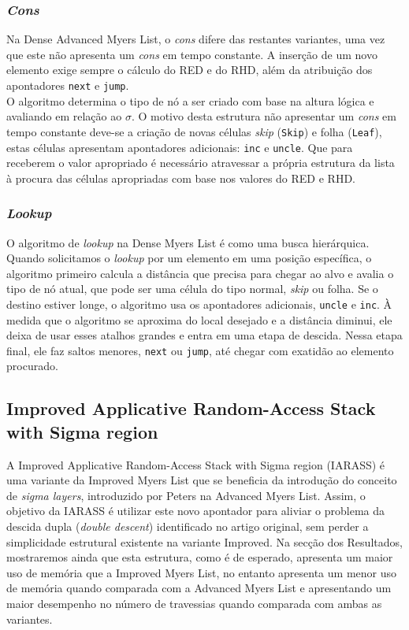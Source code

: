 \subsubsection{\textit{Cons}}

Na Dense Advanced Myers List, o \textit{cons} difere das restantes variantes, uma vez que este não apresenta um \textit{cons} em tempo constante. 
A inserção de um novo elemento exige sempre o cálculo do RED e do RHD, além da atribuição dos apontadores \texttt{next} e \texttt{jump}. 
\\

O algoritmo determina o tipo de nó a ser criado com base na altura lógica e avaliando em relação ao $\sigma$. O motivo desta estrutura não 
apresentar um \textit{cons} em tempo constante deve-se a criação de novas células \textit{skip} (\texttt{Skip}) e folha (\texttt{Leaf}), estas células apresentam apontadores adicionais: \texttt{inc} e 
\texttt{uncle}. Que para receberem o valor apropriado é necessário atravessar a própria estrutura da lista à procura das células apropriadas com base 
nos valores do RED e RHD.


\subsubsection{\textit{Lookup}}

O algoritmo de \textit{lookup} na Dense Myers List é como uma busca hierárquica. Quando solicitamos o \textit{lookup} por um elemento em uma posição específica, 
o algoritmo primeiro calcula a distância que precisa para chegar ao alvo e avalia o tipo de nó atual, que pode ser uma célula do tipo normal, 
\textit{skip} ou folha. Se o destino estiver longe, o algoritmo usa os apontadores adicionais, \texttt{uncle} e \texttt{inc}. À medida que o algoritmo se aproxima do local 
desejado e a distância diminui, ele deixa de usar esses atalhos grandes e entra em uma etapa de descida. Nessa etapa final, ele faz saltos menores, 
\texttt{next} ou \texttt{jump}, até chegar com exatidão ao elemento procurado.


\subsection{Improved Applicative Random-Access Stack with Sigma region} \label{subsec:iarass}

A Improved Applicative Random-Access Stack with Sigma region (IARASS) é uma variante da Improved Myers List que se beneficia da introdução do 
conceito de \textit{sigma layers}, introduzido por Peters \cite{peters2025} na Advanced Myers List. Assim, o objetivo da IARASS é utilizar este novo apontador
para aliviar o problema da descida dupla (\textit{double descent}) identificado no artigo original, sem perder a simplicidade estrutural existente na variante Improved.
Na secção dos Resultados, mostraremos ainda que esta estrutura, como é de esperado, apresenta um maior uso de memória que a Improved Myers List, 
no entanto apresenta um menor uso de memória quando comparada com a Advanced Myers List e apresentando um maior desempenho no número de travessias 
quando comparada com ambas as variantes.
\\

